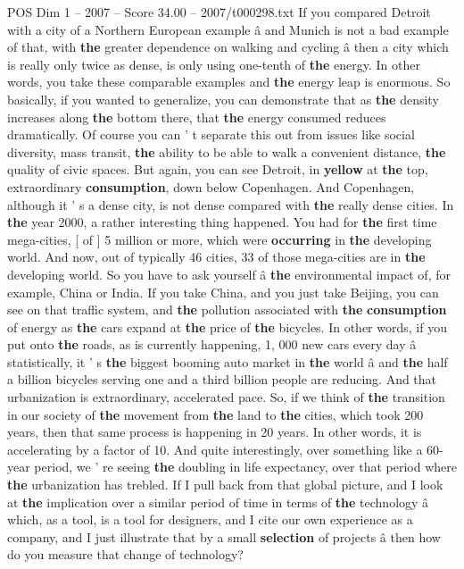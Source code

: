 \begin{textsample}{POS Dim 1 – 2007 – Score 34.00 – 2007/t000298.txt}
If you compared Detroit with a city of a Northern European example â and Munich is not a bad example of that, with \textbf{the} greater dependence on walking and cycling â then a city which is really only twice as dense, is only using one-tenth of \textbf{the} energy.
In other words, you take these comparable examples and \textbf{the} energy leap is enormous.
So basically, if you wanted to generalize, you can demonstrate that as \textbf{the} density increases along \textbf{the} bottom there, that \textbf{the} energy consumed reduces dramatically.
Of course you can ' t separate this out from issues like social diversity, mass transit, \textbf{the} ability to be able to walk a convenient distance, \textbf{the} quality of civic spaces.
But again, you can see Detroit, in \textbf{yellow} at \textbf{the} top, extraordinary \textbf{consumption}, down below Copenhagen.
And Copenhagen, although it ' s a dense city, is not dense compared with \textbf{the} really dense cities.
In \textbf{the} year 2000, a rather interesting thing happened.
You had for \textbf{the} first time mega-cities, [ of ] 5 million or more, which were \textbf{occurring} in \textbf{the} developing world.
And now, out of typically 46 cities, 33 of those mega-cities are in \textbf{the} developing world.
So you have to ask yourself â \textbf{the} environmental impact of, for example, China or India.
If you take China, and you just take Beijing, you can see on that traffic system, and \textbf{the} pollution associated with \textbf{the} \textbf{consumption} of energy as \textbf{the} cars expand at \textbf{the} price of \textbf{the} bicycles.
In other words, if you put onto \textbf{the} roads, as is currently happening, 1, 000 new cars every day â statistically, it ' s \textbf{the} biggest booming auto market in \textbf{the} world â and \textbf{the} half a billion bicycles serving one and a third billion people are reducing.
And that urbanization is extraordinary, accelerated pace.
So, if we think of \textbf{the} transition in our society of \textbf{the} movement from \textbf{the} land to \textbf{the} cities, which took 200 years, then that same process is happening in 20 years.
In other words, it is accelerating by a factor of 10.
And quite interestingly, over something like a 60-year period, we ' re seeing \textbf{the} doubling in life expectancy, over that period where \textbf{the} urbanization has trebled.
If I pull back from that global picture, and I look at \textbf{the} implication over a similar period of time in terms of \textbf{the} technology â which, as a tool, is a tool for designers, and I cite our own experience as a company, and I just illustrate that by a small \textbf{selection} of projects â then how do you measure that change of technology?

\end{textsample}
